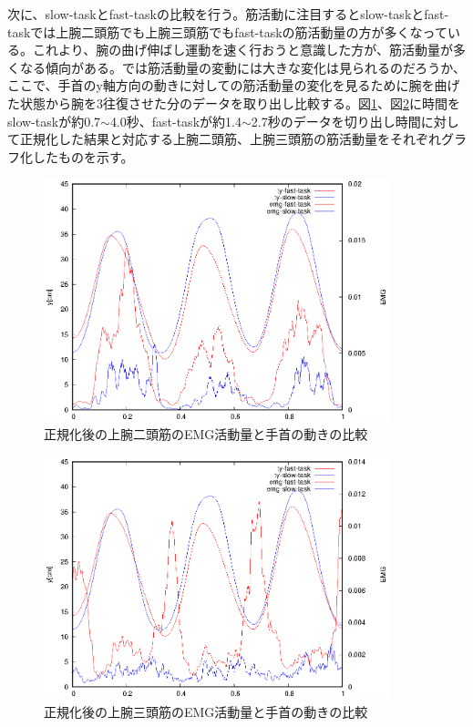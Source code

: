 \documentclass{jsarticle}
\begin{document}
\newpage
次に、slow-taskとfast-taskの比較を行う。筋活動に注目するとslow-taskとfast-taskでは上腕二頭筋でも上腕三頭筋でもfast-taskの筋活動量の方が多くなっている。これより、腕の曲げ伸ばし運動を速く行おうと意識した方が、筋活動量が多くなる傾向がある。では筋活動量の変動には大きな変化は見られるのだろうか、ここで、手首のy軸方向の動きに対しての筋活動量の変化を見るために腕を曲げた状態から腕を3往復させた分のデータを取り出し比較する。図\ref{hikaku3}、図\ref{hikaku4}に時間をslow-taskが約0.7$\sim$4.0秒、fast-taskが約1.4$\sim$2.7秒のデータを切り出し時間に対して正規化した結果と対応する上腕二頭筋、上腕三頭筋の筋活動量をそれぞれグラフ化したものを示す。
\begin{figure}[htb]
\begin{center}
\includegraphics[width=10cm]{hikakudata3.eps}
\caption{正規化後の上腕二頭筋のEMG活動量と手首の動きの比較}
\label{hikaku3}
\end{center}
\end{figure}

\begin{figure}[htb]
\begin{center}
\includegraphics[width=10cm]{hikakudata4.eps}
\caption{正規化後の上腕三頭筋のEMG活動量と手首の動きの比較}
\label{hikaku4}
\end{center}
\end{figure}
\end{document}
